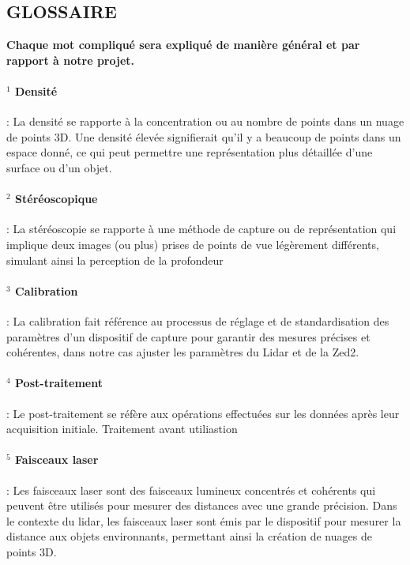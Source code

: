 \thispagestyle{empty} %
\begin{center}
    \section{\huge\textbf{{GLOSSAIRE}}}

\end{center}
\textbf{Chaque mot compliqué sera expliqué de manière général et par rapport à notre projet.} \\

\paragraph{$^1$ Densité\label{def:densite}}: La densité se rapporte à la concentration ou au nombre de points dans un nuage de points 3D. Une densité élevée signifierait qu'il y a beaucoup de points dans un espace donné, ce qui peut permettre une représentation plus détaillée d'une surface ou d'un objet.

\paragraph{$^2$ Stéréoscopique\label{def:stereoscopique}}: La stéréoscopie se rapporte à une méthode de capture ou de représentation qui implique deux images (ou plus) prises de points de vue légèrement différents, simulant ainsi la perception de la profondeur

\paragraph{$^3$ Calibration\label{def:calibration}}: La calibration fait référence au processus de réglage et de standardisation des paramètres d'un dispositif de capture pour garantir des mesures précises et cohérentes, dans notre cas ajuster les paramètres du Lidar et de la Zed2.

\paragraph{$^4$ Post-traitement\label{def:post_traitement}}: Le post-traitement se réfère aux opérations effectuées sur les données après leur acquisition initiale. Traitement avant utiliastion

\paragraph{$^5$ Faisceaux laser\label{def:faisceau_laser}}: Les faisceaux laser sont des faisceaux lumineux concentrés et cohérents qui peuvent être utilisés pour mesurer des distances avec une grande précision. Dans le contexte du lidar, les faisceaux laser sont émis par le dispositif pour mesurer la distance aux objets environnants, permettant ainsi la création de nuages de points 3D.


